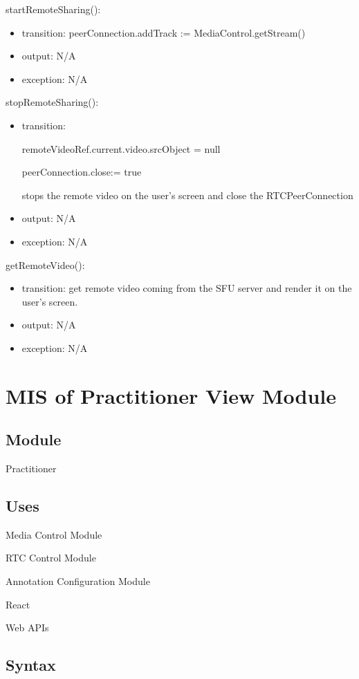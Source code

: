 \documentclass[12pt, titlepage]{article}
\begin{document}
\noindent startRemoteSharing():
\begin{itemize}
\item transition: peerConnection.addTrack := MediaControl.getStream()
\item output: N/A
\item exception: N/A
\end{itemize}

\noindent stopRemoteSharing():
\begin{itemize}
\item transition:

  remoteVideoRef.current.video.srcObject = null

  peerConnection.close:= true

  stops the remote video on the user’s screen and close the RTCPeerConnection
\item output: N/A
\item exception: N/A
\end{itemize}

\noindent getRemoteVideo():
\begin{itemize}
\item transition: get remote video coming from the SFU server and render it on the
  user's screen.
\item output: N/A
\item exception: N/A
\end{itemize}


\section{MIS of Practitioner View Module} \label{sec:pracview}

\subsection{Module}

Practitioner

\subsection{Uses}

\noindent Media Control Module

\noindent RTC Control Module

\noindent Annotation Configuration Module

\noindent React

\noindent Web APIs

\subsection{Syntax}
\end{document}
